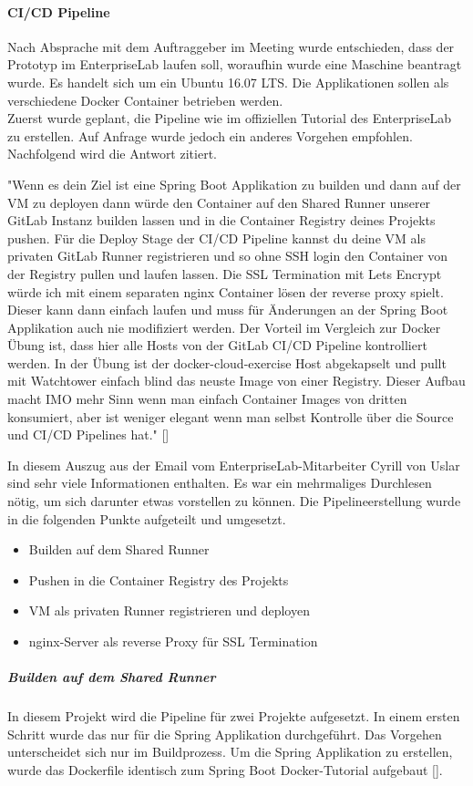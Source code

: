 \paragraph{CI/CD Pipeline}
Nach Absprache mit dem Auftraggeber im Meeting wurde entschieden, dass der Prototyp im \gls{EnterpriseLab} laufen soll, woraufhin wurde eine Maschine beantragt wurde. Es handelt sich um ein Ubuntu 16.07 LTS. Die Applikationen sollen als verschiedene Docker Container betrieben werden. \\
Zuerst wurde geplant, die Pipeline wie im offiziellen Tutorial des \gls{EnterpriseLab} zu erstellen. Auf Anfrage wurde jedoch ein anderes Vorgehen empfohlen. Nachfolgend wird die Antwort zitiert. 

"Wenn es dein Ziel ist eine Spring Boot Applikation zu builden und dann auf der VM zu deployen dann würde den Container auf den Shared Runner unserer GitLab Instanz builden lassen und in die Container Registry deines Projekts pushen. Für die Deploy Stage der CI/CD Pipeline kannst du deine VM als privaten GitLab Runner registrieren und so ohne SSH login den Container von der Registry pullen und laufen lassen. Die SSL Termination mit Lets Encrypt würde ich mit einem separaten nginx Container lösen der reverse proxy spielt. Dieser kann dann einfach laufen und muss für Änderungen an der Spring Boot Applikation auch nie modifiziert werden. Der Vorteil im Vergleich zur Docker Übung ist, dass hier alle Hosts von der GitLab CI/CD Pipeline kontrolliert werden. In der Übung ist der docker-cloud-exercise Host abgekapselt und pullt mit Watchtower einfach blind das neuste Image von einer Registry. Dieser Aufbau macht IMO mehr Sinn wenn man einfach Container Images von dritten konsumiert, aber ist weniger elegant wenn man selbst Kontrolle über die Source und CI/CD Pipelines hat." [\cite{emailEnterpriselab:private}]

In diesem Auszug aus der Email vom \gls{EnterpriseLab}-Mitarbeiter Cyrill von Uslar sind sehr viele Informationen enthalten. Es war ein mehrmaliges Durchlesen nötig, um sich darunter etwas vorstellen zu können. Die Pipelineerstellung wurde in die folgenden Punkte aufgeteilt und umgesetzt.
\begin{itemize}
	\item Builden auf dem Shared Runner 
	\item Pushen in die Container Registry des Projekts
	\item VM als privaten Runner registrieren und deployen
	\item nginx-Server als reverse Proxy für SSL Termination
\end{itemize}
\newpage
\subparagraph{Builden auf dem Shared Runner}
In diesem Projekt wird die Pipeline für zwei Projekte aufgesetzt. In einem ersten Schritt wurde das nur für die Spring Applikation durchgeführt. 
Das Vorgehen unterscheidet sich nur im Buildprozess. 
Um die Spring Applikation zu erstellen, wurde das Dockerfile identisch zum Spring Boot Docker-Tutorial aufgebaut [\cite{springBootDocker}].

